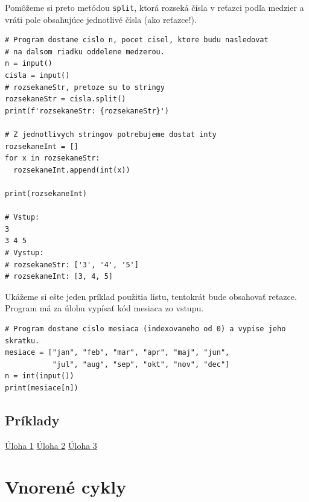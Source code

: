 \documentclass{article}
\begin{document}
Pomôžeme si preto metódou \texttt{split}, ktorá rozseká čísla v reťazci podľa medzier a vráti pole obsahujúce jednotlivé čísla (ako reťazce!).
\begin{lstlisting}
# Program dostane cislo n, pocet cisel, ktore budu nasledovat
# na dalsom riadku oddelene medzerou.
n = input()
cisla = input()
# rozsekaneStr, pretoze su to stringy
rozsekaneStr = cisla.split()
print(f'rozsekaneStr: {rozsekaneStr}')

# Z jednotlivych stringov potrebujeme dostat inty
rozsekaneInt = []
for x in rozsekaneStr:
  rozsekaneInt.append(int(x))
  
print(rozsekaneInt)

# Vstup:
3 
3 4 5
# Vystup:
# rozsekaneStr: ['3', '4', '5']
# rozsekaneInt: [3, 4, 5]
\end{lstlisting}

Ukážeme si ešte jeden príklad použitia listu, tentokrát bude obsahovať reťazce. Program má za úlohu vypísať kód mesiaca zo vstupu.
\begin{lstlisting}
# Program dostane cislo mesiaca (indexovaneho od 0) a vypise jeho skratku.
mesiace = ["jan", "feb", "mar", "apr", "maj", "jun",
           "jul", "aug", "sep", "okt", "nov", "dec"]
n = int(input())
print(mesiace[n])
\end{lstlisting}

\subsection{Príklady}
\href{https://testovac.ksp.sk/tasks/ls-uvod-zvacsi2/}{Úloha 1}
\href{https://testovac.ksp.sk/tasks/ls-uvod-sucetmensich/}{Úloha 2}
\href{https://testovac.ksp.sk/tasks/ls-uvod-pocetnajmensich/}{Úloha 3}

\section{Vnorené cykly}
\end{document}
